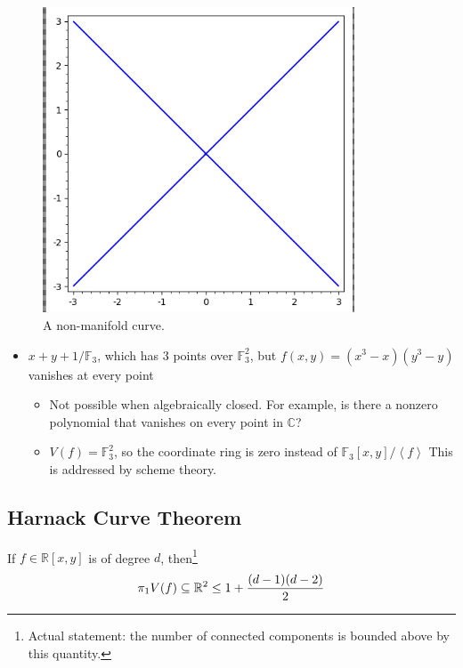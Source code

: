 \begin{example}
\begin{figure}
\centering
\includegraphics[width=3.64583in,height=\textheight]{figures/image_2020-08-21-01-23-32.png}
\caption{A non-manifold curve.}
\end{figure}

\begin{itemize}
\item
  \(x+y+1/{\mathbb{F}}_3\), which has 3 points over
  \({\mathbb{F}}_3^2\), but \(f(x, y) = (x^3 - x)(y^3-y)\) vanishes at
  every point

  \begin{itemize}
  \item
    Not possible when algebraically closed. For example, is there a
    nonzero polynomial that vanishes on every point in \({\mathbb{C}}\)?
  \item
    \(V(f) = {\mathbb{F}}_3^2\), so the coordinate ring is zero instead
    of \({\mathbb{F}}_3[x, y]/\left\langle{f}\right\rangle\) This is
    addressed by scheme theory.
  \end{itemize}
\end{itemize}

\end{example}

\hypertarget{harnack-curve-theorem}{%
\subsection{Harnack Curve Theorem}\label{harnack-curve-theorem}}

\begin{theorem}

If \(f \in {\mathbb{R}}[x, y]\) is of degree \(d\), then\footnote{Actual
  statement: the number of connected components is bounded above by this
  quantity.}
\begin{align*}  
\pi_1 V(f) \subseteq {\mathbb{R}}^2 \leq 1 + {(d-1)(d-2) \over 2}
\end{align*}

\end{theorem}

